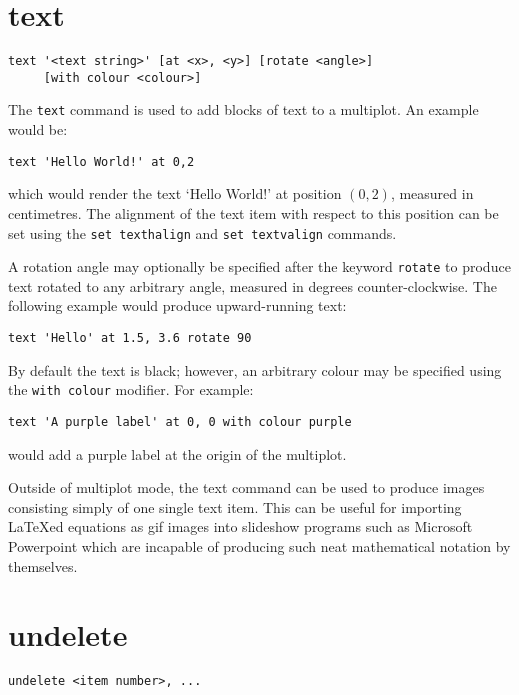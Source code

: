 \section{text}

\begin{verbatim}
text '<text string>' [at <x>, <y>] [rotate <angle>]
     [with colour <colour>]
\end{verbatim}

The {\tt text} command is used to add blocks of text to a multiplot. An example
would be:

\begin{verbatim}
text 'Hello World!' at 0,2
\end{verbatim}

\noindent which would render the text `Hello World!' at position $(0,2)$,
measured in centimetres. The alignment of the text item with respect to this
position can be set using the {\tt set texthalign} and {\tt set textvalign}
commands.

A rotation angle may optionally be specified after the keyword {\tt rotate}
to produce text rotated to any arbitrary angle, measured in degrees
counter-clockwise. The following example would produce upward-running text:

\begin{verbatim}
text 'Hello' at 1.5, 3.6 rotate 90
\end{verbatim}

By default the text is black; however, an arbitrary colour may be specified
using the {\tt with colour} modifier.  For example:

\begin{verbatim}
text 'A purple label' at 0, 0 with colour purple
\end{verbatim}

\noindent would add a purple label at the origin of the multiplot.

Outside of multiplot mode, the text command can be used to produce images
consisting simply of one single text item. This can be useful for importing
\LaTeX ed equations as gif images into slideshow programs such as Microsoft
Powerpoint which are incapable of producing such neat mathematical notation
by themselves.

\section{undelete}

\begin{verbatim}
undelete <item number>, ...
\end{verbatim}

